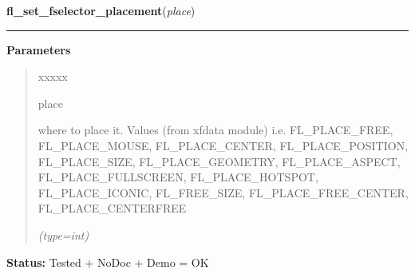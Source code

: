 \hspace{.8\funcindent}\begin{boxedminipage}{\funcwidth}

    \raggedright \textbf{fl\_set\_fselector\_placement}(\textit{place})

    \vspace{-1.5ex}

    \rule{\textwidth}{0.5\fboxrule}
\setlength{\parskip}{2ex}
\setlength{\parskip}{1ex}
      \textbf{Parameters}
      \vspace{-1ex}

      \begin{quote}
        \begin{Ventry}{xxxxx}

          \item[place]

          where to place it. Values (from xfdata module) i.e. 
          FL\_PLACE\_FREE, FL\_PLACE\_MOUSE, FL\_PLACE\_CENTER, 
          FL\_PLACE\_POSITION, FL\_PLACE\_SIZE, FL\_PLACE\_GEOMETRY, 
          FL\_PLACE\_ASPECT, FL\_PLACE\_FULLSCREEN, FL\_PLACE\_HOTSPOT, 
          FL\_PLACE\_ICONIC, FL\_FREE\_SIZE, FL\_PLACE\_FREE\_CENTER, 
          FL\_PLACE\_CENTERFREE

            {\it (type=int)}

        \end{Ventry}

      \end{quote}

\textbf{Status:} Tested + NoDoc + Demo = OK



    \end{boxedminipage}

    \label{xformslib:flgoodies:fl_set_fselector_border}

    \vspace{0.5ex}


